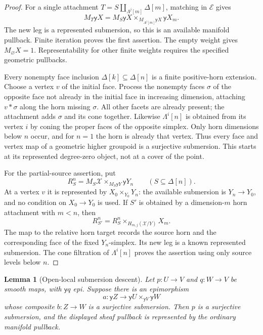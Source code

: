 \documentclass[12pt]{amsart}
\newtheorem{lem}[thm]{Lemma}
\theoremstyle{definition}
\theoremstyle{remark}
\numberwithin{equation}{section}
\newcommand{\E}{\mathcal E}
\newcommand{\y}{\mathsf y}
\begin{document}
\begin{proof}
For a single attachment $T=S\amalg_{\Lambda^j[m]}\Delta[m]$,
matching in $\E$ gives
\[
 M_T\y X
 =M_S\y X\times_{M_{\Lambda^j[m]}\y X}\y X_m.
\]
The new leg is a represented submersion, so this is an
available manifold pullback. Finite iteration proves the
first assertion. The empty weight gives $M_\varnothing X=1$.
Representability for other finite weights requires the
specified geometric pullbacks.

Every nonempty face inclusion $\Delta[k]\subseteq\Delta[n]$
is a finite positive-horn extension. Choose a vertex $v$
of the initial face. Process the nonempty faces $\sigma$
of the opposite face not already in the initial face in
increasing dimension, attaching $v*\sigma$ along the horn
missing $\sigma$. All other facets are already present;
the attachment adds $\sigma$ and its cone together.
Likewise $\Lambda^i[n]$ is obtained from its vertex $i$
by coning the proper faces of the opposite simplex.
Only horn dimensions below $n$ occur, and for $n=1$
the horn is already that vertex. Thus every face and
vertex map of a geometric higher groupoid is a
surjective submersion. This starts at its represented
degree-zero object, not at a cover of the point.

For the partial-source assertion, put
\[
 R_S^n=M_S\mathcal X\times_{M_S\y Y}\y Y_n
 \qquad(S\subseteq\Delta[n]).
\]
At a vertex $v$ it is represented by
$X_0\times_{Y_0}Y_n$: the available submersion is
$Y_n\to Y_0$, and no condition on $X_0\to Y_0$ is used.
If $S'$ is obtained by a dimension-$m$ horn attachment
with $m<n$, then
\[
 R_{S'}^n
 =R_S^n\times_{H_{m,j}(\mathcal X/Y)}X_m.
\]
The map to the relative horn target records the source
horn and the corresponding face of the fixed $Y_n$-simplex.
Its new leg is a known represented submersion.
The cone filtration of $\Lambda^i[n]$ proves the
assertion using only source levels below $n$.
\end{proof}

\begin{lem}[Open-local submersion descent]
\label{lem:ordinary-submersion-locality}
Let $p:U\to V$ and $q:W\to V$ be smooth maps, with
$\y q$ epi. Suppose there is an epimorphism
\[
 a:\y Z\longrightarrow\y U\times_{\y V}\y W
\]
whose composite $b:Z\to W$ is a surjective submersion.
Then $p$ is a surjective submersion, and the displayed
sheaf pullback is represented by the ordinary manifold
pullback.
\end{lem}
\end{document}
